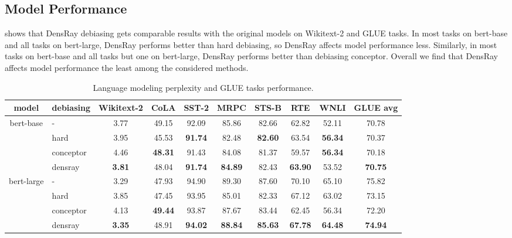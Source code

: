 \subsection{Model Performance}
 shows that DensRay debiasing gets comparable results with
the original models on Wikitext-2 and GLUE tasks.
In most tasks on bert-base and all tasks on bert-large, DensRay performs better than hard debiasing, so DensRay affects model performance less.
Similarly, in most tasks on bert-base and all tasks but one
on bert-large, DensRay performs better than debiasing conceptor. Overall we find that DensRay affects model performance the least among the considered methods.
\begin{table}[h]
\centering
\footnotesize
\vspace{0cm}  
\setlength{\abovecaptionskip}{0.1cm}   
\setlength{\belowcaptionskip}{0cm}
\begin{tabular}{c|l||c|cccccc|c}
model&debiasing & Wikitext-2&CoLA &SST-2&MRPC&STS-B&RTE&WNLI&GLUE avg\\
\hline\hline
\multirow{4}{*}{bert-base}&- &3.77&49.15&92.09&85.86&82.66&62.82&52.11&70.78\\
&hard &3.95&45.53&\textbf{91.74}&82.48&\textbf{82.60}&63.54&\textbf{56.34}&70.37\\
&conceptor &4.46&\textbf{48.31}&91.43&84.08&81.37&59.57&\textbf{56.34}&70.18\\
&densray &\textbf{3.81}&48.04&\textbf{91.74}&\textbf{84.89}&82.43&\textbf{63.90}&53.52&\textbf{70.75}\\
\hline
\multirow{4}{*}{bert-large}&- 
&3.29& 47.93&94.90&89.30&87.60&70.10&65.10&75.82\\
&hard &3.85& 47.45&93.95&85.01&82.33&67.12&63.02&73.15\\
&conceptor &4.13&\textbf{49.44}&93.87&87.67&83.44&62.45&56.34&72.20\\
&densray &\textbf{3.35}& 48.91&\textbf{94.02}&\textbf{88.84}&\textbf{85.63}&\textbf{67.78}&\textbf{64.48}&\textbf{74.94}\\
\end{tabular}
\caption{
Language modeling perplexity and GLUE tasks
performance. }
\end{table}


